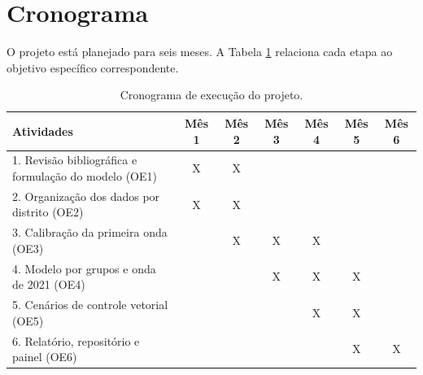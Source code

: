 \section{Cronograma}
\label{sec:cronograma}

O projeto está planejado para seis meses. A Tabela \ref{tab:cronograma} relaciona cada etapa ao objetivo
específico correspondente.

\begin{table}[h]
\centering
\small
\begin{tabular}{|p{5.9cm}|c|c|c|c|c|c|}
\hline
\textbf{Atividades} & \textbf{Mês 1} & \textbf{Mês 2} & \textbf{Mês 3} & \textbf{Mês 4} & \textbf{Mês 5} & \textbf{Mês 6} \\ \hline
1. Revisão bibliográfica e formulação do modelo (OE1) & X & X & & & & \\ \hline
2. Organização dos dados por distrito (OE2) & X & X & & & & \\ \hline
3. Calibração da primeira onda (OE3) & & X & X & X & & \\ \hline
4. Modelo por grupos e onda de 2021 (OE4) & & & X & X & X & \\ \hline
5. Cenários de controle vetorial (OE5) & & & & X & X & \\ \hline
6. Relatório, repositório e painel (OE6) & & & & & X & X \\ \hline
\end{tabular}
\caption{Cronograma de execução do projeto.}
\label{tab:cronograma}
\end{table}
